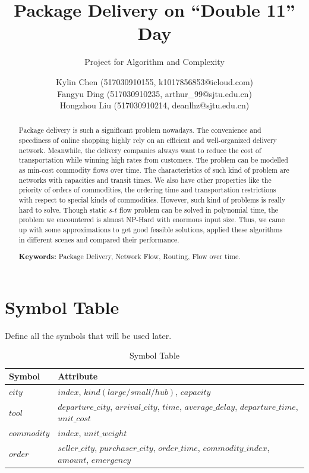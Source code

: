 \documentclass{llncs}
\title{Package Delivery on ``Double 11'' Day}
\subtitle{Project for Algorithm and Complexity \vspace{-3mm}}
\author{
Kylin Chen (517030910155, k1017856853@icloud.com) \\
Fangyu Ding (517030910235, arthur\_99@sjtu.edu.cn) \\
Hongzhou Liu (517030910214, deanlhz@sjtu.edu.cn)
  }
\institute{Department of Computer Science, \\ Shanghai Jiao Tong University, Shanghai, China}
\begin{document}



\maketitle
\begin{abstract}\vspace{-5mm}
Package delivery is such a significant problem nowadays. The convenience and speediness of online shopping highly rely on an efficient and well-organized delivery network.
Meanwhile, the delivery companies always want to reduce the cost of transportation while winning high rates from customers. The problem can be modelled as min-cost commodity flows over time.
The characteristics of such kind of problem are networks with capacities and transit times. We also have other properties like the priority of orders of commodities, the ordering time and transportation restrictions 
with respect to special kinds of commodities. However, such kind of problems is really hard to solve. Though static $s$-$t$ flow problem can be solved in polynomial time, the problem we encountered is almost NP-Hard with enormous input size.
Thus, we came up with some approximations to get good feasible solutions, applied these algorithms in different scenes and compared their performance.

\textbf{Keywords:} Package Delivery, Network Flow, Routing, Flow over time.
\end{abstract}

\section{Symbol Table}
Define all the symbols that will be used later.
\begin{table}
\caption{Symbol Table}\label{sym1}
\centering
\begin{tabular}{|l|l|}
\hline
Symbol &  Attribute \\
\hline
$city$ & $index$, $kind(large/small/hub)$, $capacity$\\
\hline
$tool$ & $departure\_city$, $arrival\_city$, $time$, $average\_delay$, $departure\_time$, $unit\_cost$ \\
\hline
$commodity$ & $index$, $unit\_weight$ \\
\hline
$order$ & $seller\_city$, $purchaser\_city$, $order\_time$, $commodity\_index$, $amount$, $emergency$ \\
\hline
\end{tabular}
\end{table}
\end{document}
